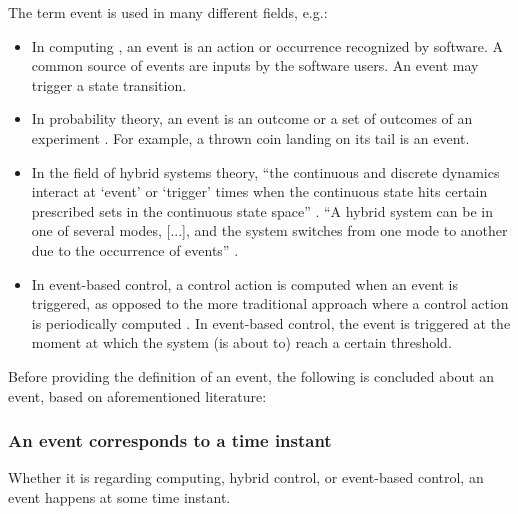 The term event is used in many different fields, e.g.:
\begin{itemize}
	\item In computing \cite{breu1997towards}, an event is an action or occurrence recognized by software. A common source of events are inputs by the software users. An event may trigger a state transition.
	\item In probability theory, an event is an outcome or a set of outcomes of an experiment \cite{pfeiffer2013concepts}. For example, a thrown coin landing on its tail is an event.
	\item In the field of hybrid systems theory, ``the continuous and discrete dynamics interact at `event' or `trigger' times when the continuous state hits certain prescribed sets in the continuous state space'' \cite{branicky1998hybridcontrol}. ``A hybrid system can be in one of several modes, [...], and the system switches from one mode to another due to the occurrence of events'' \cite{deschutter2000optimal}.
	\item In event-based control, a control action is computed when an event is triggered, as opposed to the more traditional approach where a control action is periodically computed \cite{heemels2012eventcontrol}. In event-based control, the event is triggered at the moment at which the system (is about to) reach a certain threshold.
\end{itemize}

Before providing the definition of an event, the following is concluded about an event, based on aforementioned literature:

\subsubsection{An event corresponds to a time instant}
Whether it is regarding computing, hybrid control, or event-based control, an event happens at some time instant.

